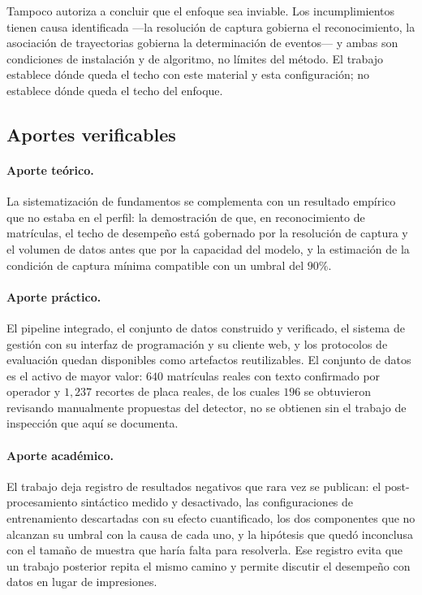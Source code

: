 Tampoco autoriza a concluir que el enfoque sea inviable. Los incumplimientos tienen
causa identificada ---la resolución de captura gobierna el reconocimiento, la
asociación de trayectorias gobierna la determinación de eventos--- y ambas son
condiciones de instalación y de algoritmo, no límites del método. El trabajo
establece dónde queda el techo con este material y esta configuración; no establece
dónde queda el techo del enfoque.

\subsection{Aportes verificables}

\paragraph{Aporte teórico.}
La sistematización de fundamentos se complementa con un resultado empírico que no
estaba en el perfil: la demostración de que, en reconocimiento de matrículas, el
techo de desempeño está gobernado por la resolución de captura y el volumen de
datos antes que por la capacidad del modelo, y la estimación de la condición de
captura mínima compatible con un umbral del $90\%$.

\paragraph{Aporte práctico.}
El pipeline integrado, el conjunto de datos construido y verificado, el sistema
de gestión con su interfaz de programación y su cliente web, y los protocolos de
evaluación quedan disponibles como artefactos reutilizables. El conjunto de datos
es el activo de mayor valor: $640$ matrículas reales con texto confirmado por
operador y $1{,}237$ recortes de placa reales, de los cuales $196$ se obtuvieron
revisando manualmente propuestas del detector, no se obtienen sin el trabajo de
inspección que aquí se documenta.

\paragraph{Aporte académico.}
El trabajo deja registro de resultados negativos que rara vez se publican: el
post-procesamiento sintáctico medido y desactivado, las configuraciones de
entrenamiento descartadas con su efecto cuantificado, los dos componentes que no
alcanzan su umbral con la causa de cada uno, y la hipótesis que quedó inconclusa con
el tamaño de muestra que haría falta para resolverla. Ese registro evita que un
trabajo posterior repita el mismo camino y permite discutir el desempeño con datos en
lugar de impresiones.
